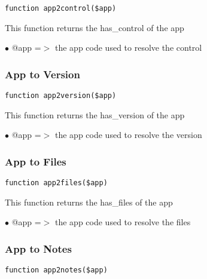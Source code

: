 \documentclass[a4paper]{article}
\begin{document}
\begin{lstlisting}
function app2control($app)
\end{lstlisting}

This function returns the has\_control of the app

\begin{compactitem}
\item[\color{myblue}$\bullet$] @app =$>$ the app code used to resolve the control
\end{compactitem}

\hypertarget{toc30}{}
\subsubsection{App to Version}

\begin{lstlisting}
function app2version($app)
\end{lstlisting}

This function returns the has\_version of the app

\begin{compactitem}
\item[\color{myblue}$\bullet$] @app =$>$ the app code used to resolve the version
\end{compactitem}

\hypertarget{toc31}{}
\subsubsection{App to Files}

\begin{lstlisting}
function app2files($app)
\end{lstlisting}

This function returns the has\_files of the app

\begin{compactitem}
\item[\color{myblue}$\bullet$] @app =$>$ the app code used to resolve the files
\end{compactitem}

\hypertarget{toc32}{}
\subsubsection{App to Notes}

\begin{lstlisting}
function app2notes($app)
\end{lstlisting}
\end{document}
